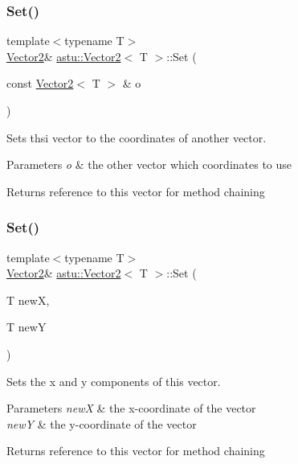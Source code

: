 \subsubsection{\texorpdfstring{Set()}{Set()}\hspace{0.1cm}{\footnotesize\ttfamily [1/2]}}
{\footnotesize\ttfamily template$<$typename T$>$ \\
\hyperlink{classastu_1_1Vector2}{Vector2}\& \hyperlink{classastu_1_1Vector2}{astu\+::\+Vector2}$<$ T $>$\+::Set (\begin{DoxyParamCaption}\item[{const \hyperlink{classastu_1_1Vector2}{Vector2}$<$ T $>$ \&}]{o }\end{DoxyParamCaption})\hspace{0.3cm}{\ttfamily [inline]}}

Sets thsi vector to the coordinates of another vector.


\begin{DoxyParams}{Parameters}
{\em o} & the other vector which coordinates to use \\
\hline
\end{DoxyParams}
\begin{DoxyReturn}{Returns}
reference to this vector for method chaining 
\end{DoxyReturn}
\mbox{\label{classastu_1_1Vector2_a0a30422e8f2bcdd161c6a98764e816b2}} 
\subsubsection{\texorpdfstring{Set()}{Set()}\hspace{0.1cm}{\footnotesize\ttfamily [2/2]}}
{\footnotesize\ttfamily template$<$typename T$>$ \\
\hyperlink{classastu_1_1Vector2}{Vector2}\& \hyperlink{classastu_1_1Vector2}{astu\+::\+Vector2}$<$ T $>$\+::Set (\begin{DoxyParamCaption}\item[{T}]{newX,  }\item[{T}]{newY }\end{DoxyParamCaption})\hspace{0.3cm}{\ttfamily [inline]}}

Sets the x and y components of this vector.


\begin{DoxyParams}{Parameters}
{\em newX} & the x-\/coordinate of the vector \\
\hline
{\em newY} & the y-\/coordinate of the vector \\
\hline
\end{DoxyParams}
\begin{DoxyReturn}{Returns}
reference to this vector for method chaining 
\end{DoxyReturn}
\mbox{\label{classastu_1_1Vector2_afeae7c216e2c0846f576a11563a6404c}} 
